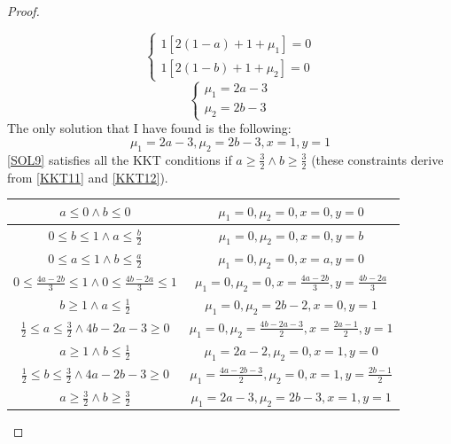\begin{proof}
\begin{enumerate}
\[\begin{cases}
                    1[2(1-a) + 1 + \mu_1] = 0 \\
                    1[2(1-b) + 1 + \mu_2] = 0
                \end{cases}
            \]
            \[
                \begin{cases}
                    \mu_1 = 2a - 3 \\
                    \mu_2 = 2b - 3
                \end{cases}
            \]
            The only solution that I have found is the following:
            \begin{equation} \label{SOL9}
                \mu_1 = 2a - 3, \mu_2 = 2b - 3, x = 1, y = 1 \tag{SOL9}
            \end{equation}
            \eqref{SOL9} satisfies all the KKT conditions if \(a \geq \frac{3}{2} \land b \geq \frac{3}{2}\) (these constraints derive from \eqref{KKT11} and \eqref{KKT12}).
    \end{enumerate}
    \begin{table}
        \centering
        \begin{tabu}{| c | c |}
            \hline
            \(a \leq 0 \land b \leq 0\) &   \(\mu_1 = 0, \mu_2 = 0, x = 0, y = 0    \) \\ \hline
            \(0 \leq b \leq 1 \land a \leq \frac{b}{2}\) &   \(\mu_1 = 0, \mu_2 = 0, x = 0, y = b\) \\ \hline
            \(0 \leq a \leq 1 \land b \leq \frac{a}{2}\) &   \(\mu_1 = 0, \mu_2 = 0, x = a, y = 0\) \\ \hline
            \(0 \leq \frac{4a-2b}{3} \leq 1 \land 0 \leq \frac{4b-2a}{3} \leq 1\) &   \(\mu_1 = 0, \mu_2 = 0, x = \frac{4a - 2b}{3}, y = \frac{4b-2a}{3}\) \\ \hline
            \(b \geq 1 \land a \leq \frac{1}{2}\) &   \(\mu_1 = 0, \mu_2 = 2b - 2, x = 0, y = 1\) \\ \hline
            \(\frac{1}{2} \leq a \leq \frac{3}{2} \land 4b -2a -3 \geq 0\) &   \(\mu_1 = 0, \mu_2 = \frac{4b - 2a - 3}{2}, x = \frac{2a - 1}{2}, y = 1\) \\ \hline
            \(a \geq 1 \land b \leq \frac{1}{2}\) &   \(\mu_1 = 2a - 2, \mu_2 = 0, x = 1, y = 0\) \\ \hline
            \(\frac{1}{2} \leq b \leq \frac{3}{2} \land 4a -2b -3 \geq 0\) &   \(\mu_1 = \frac{4a - 2b - 3}{2}, \mu_2 = 0, x = 1, y = \frac{2b - 1}{2}\) \\ \hline
            \(a \geq \frac{3}{2} \land b \geq \frac{3}{2}\) &   \(\mu_1 = 2a - 3, \mu_2 = 2b - 3, x = 1, y = 1\) \\ \hline

\end{tabu}
\end{table}
\end{proof}
